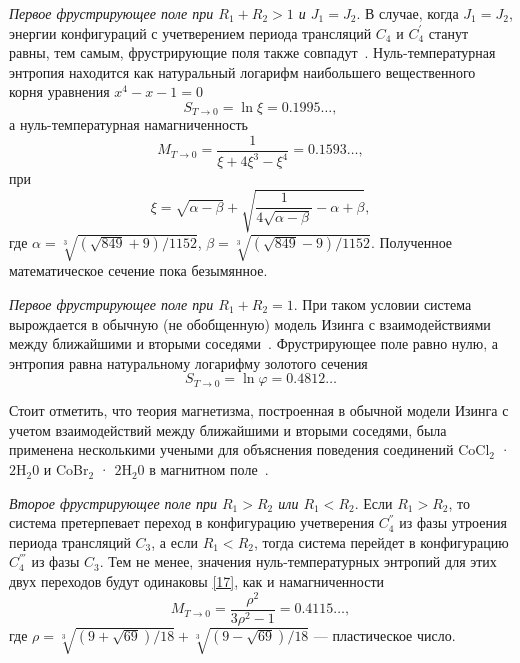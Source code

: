 \emph{Первое фрустрирующее поле при $R_1 + R_2 > 1$ и $J_1 = J_2$}. В случае, когда $J_1 = J_2$, энергии конфигураций с учетверением периода трансляций $C_4$ и $C_4^{'}$ станут равны, тем самым, фрустрирующие поля также совпадут~\cite{zarubin2019}. Нуль-температурная энтропия находится как натуральный логарифм наибольшего вещественного корня уравнения $x^4-x-1=0$
\begin{equation}
S_{T\rightarrow 0} = \ln \xi = 0.1995\dots,
\label{18}
\end{equation}
а нуль-температурная намагниченность
\begin{equation}
M_{T\rightarrow 0} = \frac{1}{\xi+4\xi^3-\xi^4} = 0.1593\dots,
\label{19}
\end{equation}
при 
\begin{equation*}
\xi = \sqrt{\alpha- \beta} + \sqrt{\frac{1}{4\sqrt{\alpha - \beta}}-\alpha+\beta},
\end{equation*}
где $\alpha = \sqrt[3]{(\sqrt{849}+9)/1152}$, $\beta = \sqrt[3]{(\sqrt{849}-9)/1152}$.
Полученное математическое сечение пока безымянное.

\emph{Первое фрустрирующее поле при $R_1 + R_2 = 1$}. При таком условии система вырождается в обычную (не обобщенную)
модель Изинга с взаимодействиями между ближайшими и вторыми соседями~\cite{zarubin2019}. Фрустрирующее поле равно нулю, а энтропия равна натуральному логарифму золотого сечения 
\begin{equation}
S_{T\rightarrow 0} = \ln \varphi = 0.4812\dots
\label{20}
\end{equation}

Стоит отметить, что теория магнетизма, построенная в обычной модели Изинга с учетом взаимодействий между ближайшими и вторыми соседями, была применена несколькими учеными для объяснения поведения соединений CoCl$_2$ ·$2$H$_2$0 и CoBr$_2$ · $2$H$_2$0 в магнитном поле~\cite{oguchi1965, narath1964, kobayashi1964}.

\emph{Второе фрустрирующее поле при $R_1 > R_2$ или $R_1 < R_2$}. Если $R_1 > R_2$, то система претерпевает переход в конфигурацию учетверения $C_4^{''}$ из фазы утроения периода трансляций $C_3$, а если $R_1 < R_2$, тогда система перейдет в конфигурацию $C_{4}^{'''}$ из фазы $C_3$.
Тем не менее, значения нуль-температурных энтропий для этих двух переходов будут одинаковы \eqref{17}, как и намагниченности
\begin{equation}
M_{T\rightarrow 0} = \frac{\rho^2}{3\rho^2-1} = 0.4115\dots,
\label{21}
\end{equation}
где $\rho = \sqrt[3]{(9+\sqrt{69})/18}+\sqrt[3]{(9-\sqrt{69})/18}$ --- пластическое число.

